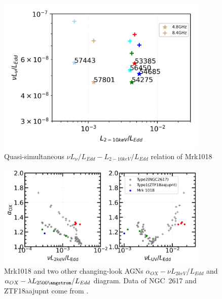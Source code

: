 \begin{figure}
\centering
	\includegraphics[width=0.9\textwidth]{./pic/Mrk1018_radio_xray_sel1_rate.png}
    \caption{Quasi-simultaneous $\nu L_{\nu}/L_{Edd}-L_{2-10keV}/L_{Edd}$ relation of Mrk1018}
    \label{fig:radio-xray-relation}
\end{figure}



\begin{figure}
\centering
	\includegraphics[width=0.9\textwidth]{./pic/Mrk1018_subplots_plus_2individuals_alpha_ox_L_x_Luv_rate.png}
    \caption{Mrk1018 and two other changing-look AGNs $\alpha_{OX}-\nu L_{2keV}/L_{Edd}$ and $\alpha_{OX}-\lambda L_{2500 \angstrom}/L_{Edd}$ diagram. Data of NGC~2617 and ZTF18aajupnt come from \citet{2019arXiv190904676R}.  }
    \label{fig:alpha_ox_luv}
\end{figure}



